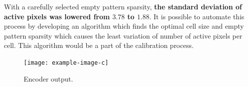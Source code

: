 With a carefully selected empty pattern sparsity, \textbf{the standard deviation of active pixels was lowered from $\mathbf{3.78}$ to $\mathbf{1.88}$}. It is possible to automate this process by developing an algorithm which finds the optimal cell size and empty pattern sparsity which causes the least variation of number of active pixels per cell. This algorithm would be a part of the calibration process.
\begin{figure}[H]
    \centering
    \texttt{[image: example-image-c]}
    \caption{Encoder output.}
    \label{fig:encoder_output}
\end{figure}

